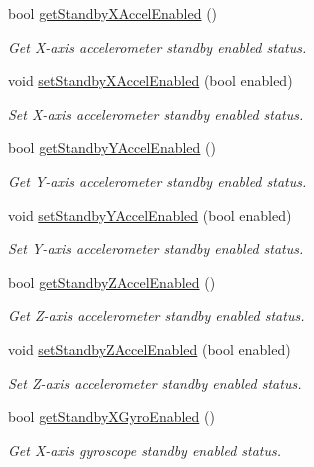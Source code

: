 \begin{DoxyCompactItemize}
bool \mbox{\hyperlink{classMPU6050_a99261a04739fdb7a9a1c5b67ce3e710e}{get\+Standby\+X\+Accel\+Enabled}} ()
\begin{DoxyCompactList}\small\item\em Get X-\/axis accelerometer standby enabled status. \end{DoxyCompactList}\item 
void \mbox{\hyperlink{classMPU6050_af4df87fd2e87f41d06706cfd5bbc2a2c}{set\+Standby\+X\+Accel\+Enabled}} (bool enabled)
\begin{DoxyCompactList}\small\item\em Set X-\/axis accelerometer standby enabled status. \end{DoxyCompactList}\item 
bool \mbox{\hyperlink{classMPU6050_a104f2ec438d745f8fdeec202bae09b48}{get\+Standby\+Y\+Accel\+Enabled}} ()
\begin{DoxyCompactList}\small\item\em Get Y-\/axis accelerometer standby enabled status. \end{DoxyCompactList}\item 
void \mbox{\hyperlink{classMPU6050_a7ce7d3299479eb66518acf0697132835}{set\+Standby\+Y\+Accel\+Enabled}} (bool enabled)
\begin{DoxyCompactList}\small\item\em Set Y-\/axis accelerometer standby enabled status. \end{DoxyCompactList}\item 
bool \mbox{\hyperlink{classMPU6050_adae85612e047c4c7f0c3b7110fc92956}{get\+Standby\+Z\+Accel\+Enabled}} ()
\begin{DoxyCompactList}\small\item\em Get Z-\/axis accelerometer standby enabled status. \end{DoxyCompactList}\item 
void \mbox{\hyperlink{classMPU6050_ac5fd917549d2ed0f12b8a17167271199}{set\+Standby\+Z\+Accel\+Enabled}} (bool enabled)
\begin{DoxyCompactList}\small\item\em Set Z-\/axis accelerometer standby enabled status. \end{DoxyCompactList}\item 
bool \mbox{\hyperlink{classMPU6050_acb5fde4167aa54fbbe84706d577a48a6}{get\+Standby\+X\+Gyro\+Enabled}} ()
\begin{DoxyCompactList}\small\item\em Get X-\/axis gyroscope standby enabled status. \end{DoxyCompactList}\item 

\end{DoxyCompactItemize}
